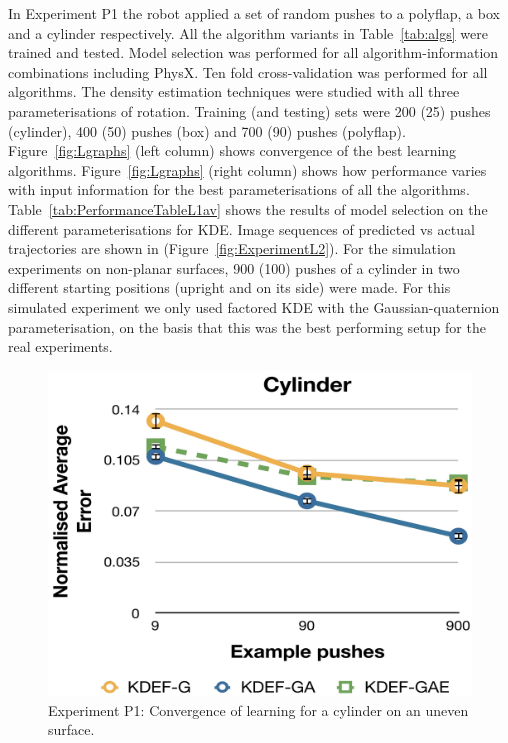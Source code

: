 In Experiment P1 the robot applied a set of random pushes to a
polyflap, a box and a cylinder respectively. All the algorithm
variants in Table~\ref{tab:algs} were trained and tested. Model
selection was performed for all algorithm-information combinations including PhysX. Ten fold cross-validation was performed for all algorithms. The density estimation techniques were studied with all three parameterisations of rotation. Training (and testing) sets were 200 (25) pushes (cylinder), 400 (50) pushes (box) and 700 (90) pushes (polyflap). Figure~\ref{fig:Lgraphs} (left column) shows convergence of the best learning algorithms. Figure~\ref{fig:Lgraphs} (right column) shows how performance varies with input information for the best parameterisations of all the algorithms. Table~\ref{tab:PerformanceTableL1av} shows the results of model selection on the different parameterisations for KDE. Image sequences of predicted vs actual trajectories are shown in (Figure~\ref{fig:ExperimentL2}). For the simulation experiments on non-planar surfaces, 900 (100) pushes of a cylinder in two different starting positions (upright and on its side) were made. For this simulated experiment we only used factored KDE  with the Gaussian-quaternion parameterisation, on the basis that this was the best performing setup for the real experiments. 

\begin{figure}[t]
\centerline{
\includegraphics[width=0.9\columnwidth]{./L1av-graph-cyl-sim}
}
\vspace{-1mm}
\caption{Experiment P1: Convergence of learning for a cylinder on an uneven surface. \label{fig:Lgraph-uneven}}
\end{figure}

